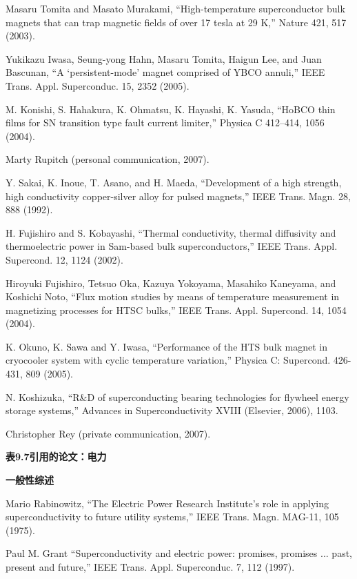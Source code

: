 \noindent [9.14] Masaru Tomita and Masato Murakami, ``High-temperature superconductor bulk magnets that can trap magnetic fields of over 17 tesla at 29 K,” Nature 421, 517 (2003).

\noindent [9.15] Yukikazu Iwasa, Seung-yong Hahn, Masaru Tomita, Haigun Lee, and Juan Bascunan, ``A ‘persistent-mode’ magnet comprised of YBCO annuli,” IEEE Trans.
Appl. Superconduc. 15, 2352 (2005).

\noindent [9.16] M. Konishi, S. Hahakura, K. Ohmatsu, K. Hayashi, K. Yasuda, ``HoBCO thin films for SN transition type fault current limiter,” Physica C 412–414, 1056 (2004).

\noindent [9.17] Marty Rupitch (personal communication, 2007).

\noindent [9.18] Y. Sakai, K. Inoue, T. Asano, and H. Maeda, ``Development of a high strength, high conductivity copper-silver alloy for pulsed magnets,” IEEE Trans. Magn. 28, 888 (1992).

\noindent [9.19] H. Fujishiro and S. Kobayashi, ``Thermal conductivity, thermal diffusivity and thermoelectric power in Sam-based bulk superconductors,” IEEE Trans. Appl. Supercond. 12, 1124 (2002).

\noindent [9.20] Hiroyuki Fujishiro, Tetsuo Oka, Kazuya Yokoyama, Masahiko Kaneyama, and Koshichi Noto, ``Flux motion studies by means of temperature measurement in magnetizing processes for HTSC bulks,” IEEE Trans. Appl. Supercond. 14, 1054 (2004).

\noindent [9.21] K. Okuno, K. Sawa and Y. Iwasa, ``Performance of the HTS bulk magnet in cryocooler system with cyclic temperature variation,” Physica C: Supercond. 426-431, 809 (2005).

\noindent [9.22] N. Koshizuka, ``R\&D of superconducting bearing technologies for flywheel energy storage systems,” Advances in Superconductivity XVIII (Elsevier, 2006), 1103.

\noindent [9.23] Christopher Rey (private communication, 2007).

\noindent \textbf{表9.7引用的论文：电力}

\noindent \textbf{一般性综述}

\noindent [9.24] Mario Rabinowitz, ``The Electric Power Research Institute’s role in applying superconductivity
to future utility systems,” IEEE Trans. Magn. MAG-11, 105 (1975).

\noindent [9.25] Paul M. Grant ``Superconductivity and electric power: promises, promises ... past,
present and future,” IEEE Trans. Appl. Superconduc. 7, 112 (1997).

